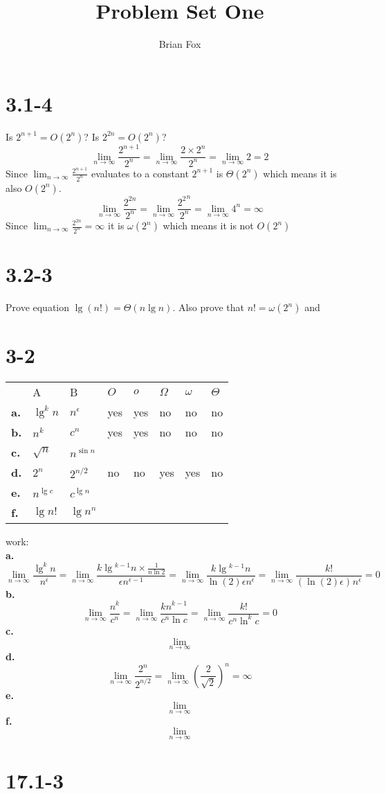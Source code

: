 \documentclass[12pt]{article}
\author{Brian Fox}
\title{Problem Set One}
\begin{document}
\section{3.1-4}
Is $2^{n+1} = O(2^{n})$? Is $2^{2n} = O(2^{n})$?
$$\lim_{n\to\infty} \frac{2^{n+1}}{2^{n}} = \lim_{n\to\infty} \frac{2\times2^{n}}{2^{n}} = \lim_{n\to\infty} 2 = 2$$
Since $\lim_{n\to\infty} \frac{2^{n+1}}{2^{n}}$ evaluates to a constant $2^{n+1}$ is $\Theta(2^{n})$ which means it is also $O(2^{n})$.
$$\lim_{n\to\infty} \frac{2^{2n}}{2^{n}} = \lim_{n\to\infty} \frac{{2^2}^n}{2^{n}} = \lim_{n\to\infty} 4^{n} = \infty$$
Since $\lim_{n\to\infty} \frac{2^{2n}}{2^{n}} = \infty$ it is $\omega(2^{n})$ which means it is not $O(2^{n})$
\section{3.2-3}
Prove equation $\lg{}(n!) = \Theta(n\lg{n}) $. Also prove that $n! = \omega{}(2^{n})$ and $ $
\section{3-2}
\begin{table}[h]
\begin{tabular}{lll|l|l|l|l|l|}
& A & B & $O$ & $o$ & $\Omega$ & $\omega$ & $\Theta$ \\ \cline{2-8}
\textbf{a.} & $\lg^{k}n$ & $n^{\epsilon}$ & yes & yes &  no  &  no    & no  \\ \cline{2-8}
\textbf{b.} & $n^{k}$ & $c^{n}$ & yes & yes & no & no & no \\ \cline{2-8}
\textbf{c.} & $\sqrt{n}$ & $n^{\sin{n}}$ &  &  &  &  &  \\ \cline{2-8}
\textbf{d.} & $2^{n}$ & $2^{n/2}$ & no & no & yes & yes & no \\ \cline{2-8}
\textbf{e.} & $n^{\lg{c}}$ & $c^{\lg{n}}$ &  &  &  &  &  \\ \cline{2-8}
\textbf{f.} & $\lg{n!}$ & $\lg{n^n}$ &  &  &  &  &  \\ \cline{2-8} 
\end{tabular}
\end{table}
work:\\
\textbf{a.} $$ \lim_{n\to\infty} \frac{\lg^{k}n}{n^{\epsilon}} =  \lim_{n\to\infty} \frac{k\lg{}^{k-1}n\times\frac{1}{n\ln{2}}}{\epsilon{}n^{\epsilon-1}} = \lim_{n\to\infty} \frac{k\lg{}^{k-1}n}{\ln(2)\epsilon{}n^{\epsilon}} = \lim_{n\to\infty} \frac{k!}{(\ln(2)\epsilon{})^{}n^{\epsilon}} = 0$$
\textbf{b.} $$ \lim_{n\to\infty} \frac{n^k}{c^n} = \lim_{n\to\infty} \frac{kn^{k-1}}{c^n\ln{c}} = \lim_{n\to\infty} \frac{k!}{c^n\ln^kc} = 0$$
\textbf{c.} $$ \lim_{n\to\infty} $$
\textbf{d.} $$ \lim_{n\to\infty} \frac{2^n}{2^{n/2}} = \lim_{n\to\infty} (\frac{2}{\sqrt{2}})^{n} = \infty$$
\textbf{e.} $$ \lim_{n\to\infty} $$
\textbf{f.} $$ \lim_{n\to\infty} $$

\section{17.1-3}
\end{document}
